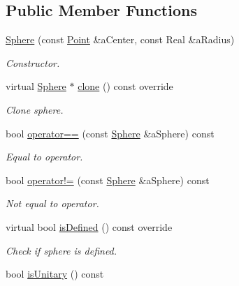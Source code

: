 \subsection*{Public Member Functions}
\begin{DoxyCompactItemize}
\item 
\hyperlink{classostk_1_1math_1_1geom_1_1d3_1_1objects_1_1_sphere_a6920f72260a7b2c9ffc29283540e16c2}{Sphere} (const \hyperlink{classostk_1_1math_1_1geom_1_1d3_1_1objects_1_1_point}{Point} \&a\+Center, const Real \&a\+Radius)
\begin{DoxyCompactList}\small\item\em Constructor. \end{DoxyCompactList}\item 
virtual \hyperlink{classostk_1_1math_1_1geom_1_1d3_1_1objects_1_1_sphere}{Sphere} $\ast$ \hyperlink{classostk_1_1math_1_1geom_1_1d3_1_1objects_1_1_sphere_a123c8f9f89be73d95db4a0c8dd8c1c7b}{clone} () const override
\begin{DoxyCompactList}\small\item\em Clone sphere. \end{DoxyCompactList}\item 
bool \hyperlink{classostk_1_1math_1_1geom_1_1d3_1_1objects_1_1_sphere_a1bb642dd7e97756a44ca972e6337a43f}{operator==} (const \hyperlink{classostk_1_1math_1_1geom_1_1d3_1_1objects_1_1_sphere}{Sphere} \&a\+Sphere) const
\begin{DoxyCompactList}\small\item\em Equal to operator. \end{DoxyCompactList}\item 
bool \hyperlink{classostk_1_1math_1_1geom_1_1d3_1_1objects_1_1_sphere_ae72e72141c1c4526bfa86161ffb15a37}{operator!=} (const \hyperlink{classostk_1_1math_1_1geom_1_1d3_1_1objects_1_1_sphere}{Sphere} \&a\+Sphere) const
\begin{DoxyCompactList}\small\item\em Not equal to operator. \end{DoxyCompactList}\item 
virtual bool \hyperlink{classostk_1_1math_1_1geom_1_1d3_1_1objects_1_1_sphere_ab236f8c380bcc2164a5a606fdf8bc3a6}{is\+Defined} () const override
\begin{DoxyCompactList}\small\item\em Check if sphere is defined. \end{DoxyCompactList}\item 
bool \hyperlink{classostk_1_1math_1_1geom_1_1d3_1_1objects_1_1_sphere_a9e1c2a66a1d61d461e0e02d5a6cce709}{is\+Unitary} () const

\end{DoxyCompactItemize}

